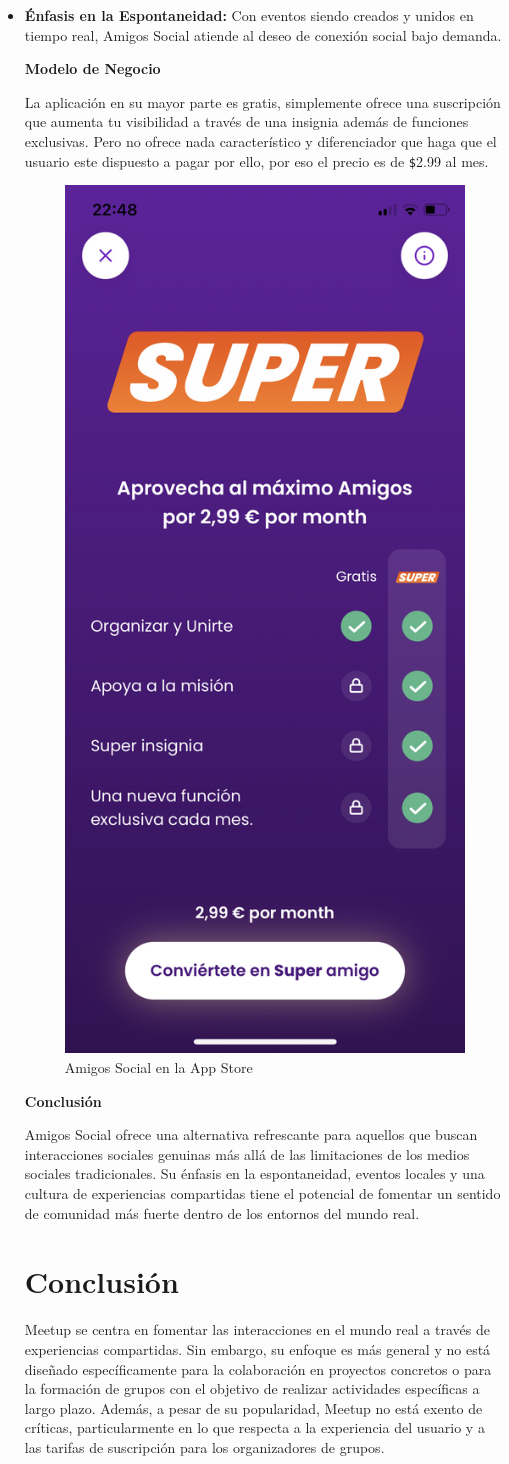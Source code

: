 \begin{itemize}
\item \textbf{Énfasis en la Espontaneidad:} Con eventos siendo creados y unidos en tiempo real, Amigos Social atiende al deseo de conexión social bajo demanda.

\textbf{Modelo de Negocio}

La aplicación en su mayor parte es gratis, simplemente ofrece una suscripción que aumenta tu visibilidad a través de una insignia además de funciones exclusivas.
Pero no ofrece nada característico y diferenciador que haga que el usuario este dispuesto a pagar por ello, por eso el precio es de \verb|$|2.99 al mes.

\begin{figure}[H]
  \centering
  \includegraphics[cframe=black 2pt,width=0.3\linewidth]{images/estadodelarte/amigossocialsuper.jpeg}
  \caption{Amigos Social en la App Store}
  \label{fig:amigosocial_appstore}
\end{figure}

\textbf{Conclusión}

Amigos Social ofrece una alternativa refrescante para aquellos que buscan interacciones sociales genuinas más allá de las limitaciones de los medios sociales tradicionales. Su énfasis en la espontaneidad, eventos locales y una cultura de experiencias compartidas tiene el potencial de fomentar un sentido de comunidad más fuerte dentro de los entornos del mundo real.


\section{Conclusión}

Meetup se centra en fomentar las interacciones en el mundo real a 
través de experiencias compartidas. Sin embargo, su enfoque es más 
general y no está diseñado específicamente para la colaboración en 
proyectos concretos o para la formación de grupos con el objetivo de 
realizar actividades específicas a largo plazo. Además, a pesar de su 
popularidad, Meetup no está exento de críticas, particularmente en lo 
que respecta a la experiencia del usuario y a las tarifas de suscripción 
para los organizadores de grupos.


\end{itemize}
